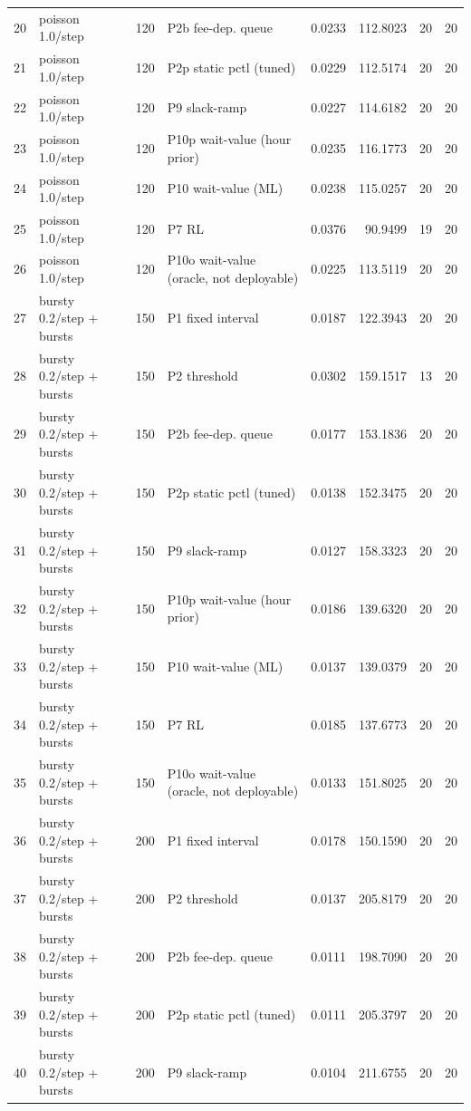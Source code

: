 \begin{tabular}{llrlrrrr}
20 & poisson 1.0/step & 120 & P2b fee-dep. queue & 0.0233 & 112.8023 & 20 & 20 \\
21 & poisson 1.0/step & 120 & P2p static pctl (tuned) & 0.0229 & 112.5174 & 20 & 20 \\
22 & poisson 1.0/step & 120 & P9 slack-ramp & 0.0227 & 114.6182 & 20 & 20 \\
23 & poisson 1.0/step & 120 & P10p wait-value (hour prior) & 0.0235 & 116.1773 & 20 & 20 \\
24 & poisson 1.0/step & 120 & P10 wait-value (ML) & 0.0238 & 115.0257 & 20 & 20 \\
25 & poisson 1.0/step & 120 & P7 RL & 0.0376 & 90.9499 & 19 & 20 \\
26 & poisson 1.0/step & 120 & P10o wait-value (oracle, not deployable) & 0.0225 & 113.5119 & 20 & 20 \\
27 & bursty 0.2/step + bursts & 150 & P1 fixed interval & 0.0187 & 122.3943 & 20 & 20 \\
28 & bursty 0.2/step + bursts & 150 & P2 threshold & 0.0302 & 159.1517 & 13 & 20 \\
29 & bursty 0.2/step + bursts & 150 & P2b fee-dep. queue & 0.0177 & 153.1836 & 20 & 20 \\
30 & bursty 0.2/step + bursts & 150 & P2p static pctl (tuned) & 0.0138 & 152.3475 & 20 & 20 \\
31 & bursty 0.2/step + bursts & 150 & P9 slack-ramp & 0.0127 & 158.3323 & 20 & 20 \\
32 & bursty 0.2/step + bursts & 150 & P10p wait-value (hour prior) & 0.0186 & 139.6320 & 20 & 20 \\
33 & bursty 0.2/step + bursts & 150 & P10 wait-value (ML) & 0.0137 & 139.0379 & 20 & 20 \\
34 & bursty 0.2/step + bursts & 150 & P7 RL & 0.0185 & 137.6773 & 20 & 20 \\
35 & bursty 0.2/step + bursts & 150 & P10o wait-value (oracle, not deployable) & 0.0133 & 151.8025 & 20 & 20 \\
36 & bursty 0.2/step + bursts & 200 & P1 fixed interval & 0.0178 & 150.1590 & 20 & 20 \\
37 & bursty 0.2/step + bursts & 200 & P2 threshold & 0.0137 & 205.8179 & 20 & 20 \\
38 & bursty 0.2/step + bursts & 200 & P2b fee-dep. queue & 0.0111 & 198.7090 & 20 & 20 \\
39 & bursty 0.2/step + bursts & 200 & P2p static pctl (tuned) & 0.0111 & 205.3797 & 20 & 20 \\
40 & bursty 0.2/step + bursts & 200 & P9 slack-ramp & 0.0104 & 211.6755 & 20 & 20 \\

\end{tabular}
